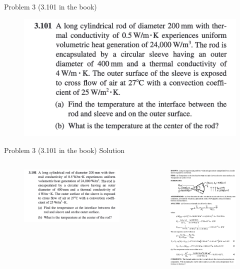\documentclass[9pt, aspectratio=169, handout]{beamer}
\begin{document}
\begin{frame}{Problem 3 (3.101 in the book)}
    \begin{figure}
        \centering
        \includegraphics[width=.5\textwidth]{Figures/fig1.3.jpg}
    \end{figure}
\end{frame}

\begin{frame}{Problem 3 (3.101 in the book) Solution}
    \begin{columns}
        \begin{figure}
            \centering
            \includegraphics[width=\textwidth]{Figures/fig1.3.jpg}
        \end{figure}
        \begin{figure}
            \centering
            \includegraphics[width=.7\textwidth]{Figures/fig1.3_solution.jpg}

\end{figure}
\end{columns}
\end{frame}
\end{document}
